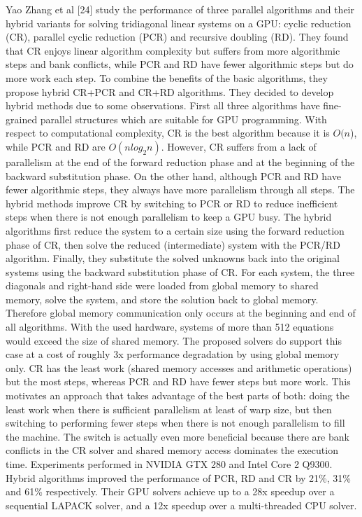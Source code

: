 Yao Zhang et al [24] study the performance of three parallel algorithms and their hybrid variants for solving tridiagonal linear systems on a GPU: cyclic reduction (CR), parallel cyclic reduction (PCR) and recursive doubling (RD). They found that CR enjoys linear algorithm complexity but suffers from more algorithmic steps and bank conflicts, while PCR and RD have fewer algorithmic steps but do more work each step. To combine the benefits of the basic algorithms, they propose hybrid CR+PCR and CR+RD algorithms. They decided to develop hybrid methods due to some observations. First all three algorithms have fine-grained parallel structures which are suitable for GPU programming. With respect to computational complexity, CR is the best algorithm because it is $O(n$), while PCR and RD are $O(nlog_2n)$. However, CR suffers from a lack of parallelism at the end of the forward reduction phase and at the beginning of the backward substitution phase. On the other hand, although PCR and RD have fewer algorithmic steps, they always have more parallelism through all steps. The hybrid methods improve CR by switching to PCR or RD to reduce inefficient steps when there is not enough parallelism to keep a GPU busy. The hybrid algorithms first reduce the system to a certain size using the forward reduction phase of CR, then solve the reduced (intermediate) system with the PCR/RD algorithm. Finally, they substitute the solved unknowns back into the original systems using the backward substitution phase of CR. For each system, the three diagonals and right-hand side were loaded from global memory to shared memory, solve the system, and store the solution back to global memory. Therefore global memory communication only occurs at the beginning and end of all algorithms. With the used hardware, systems of more than 512 equations would exceed the size of shared memory. The proposed solvers do support this case at a cost of roughly 3x performance degradation by using global memory only. CR has the least work (shared memory accesses and arithmetic operations) but the most steps, whereas PCR and RD have fewer steps but more work. This motivates an approach that takes advantage of the best parts of both: doing the least work when there is sufficient parallelism at least of warp size, but then switching to performing fewer steps when there is not enough parallelism to fill the machine. The switch is actually even more beneficial because there are bank conflicts in the CR solver and shared memory access dominates the execution time. Experiments performed in NVIDIA GTX 280 and Intel Core 2 Q9300. Hybrid algorithms improved the performance of PCR, RD and CR by 21\%, 31\% and 61\% respectively. Their GPU solvers achieve up to a 28x speedup over a sequential LAPACK solver, and a 12x speedup over a multi-threaded CPU solver.

